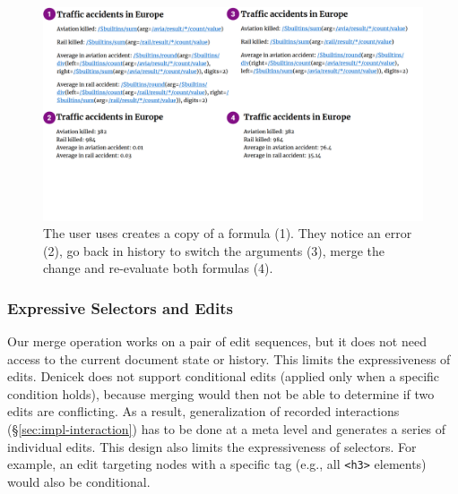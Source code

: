 \documentclass[sigconf,anonymous,screen]{acmart}
\begin{document}

\begin{figure}[t]
\vspace{-0.5em}
\includegraphics[width=1\columnwidth,clip,trim=0cm 5.5cm 1cm 0cm]{fig/copypaste.pdf}
\vspace{-1.5em}
\caption{The user uses creates a copy of a formula (1). They notice an error (2), go back in
history to switch the arguments (3), merge the change and re-evaluate both formulas (4).}
\label{fig:copypaste}
\vspace{-0.5em}
\end{figure}


\subsubsection*{Expressive Selectors and Edits}
Our merge operation works on a pair of edit sequences, but it does not need access
to the current document state or history. This limits the expressiveness of edits. Denicek does not
support conditional edits (applied only when a specific condition holds), because merging would then
not be able to determine if two edits are conflicting. As a result, generalization of recorded
interactions (\S\ref{sec:impl-interaction}) has to be done at a meta level and generates a series
of individual edits. This design also limits the expressiveness of selectors. For example,
an edit targeting nodes with a specific tag (e.g., all {\small\Verb_<h3>_} elements) would also be
conditional.
\end{document}
